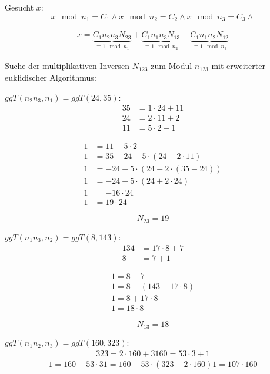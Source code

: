 Gesucht $x$:
$$ x \mod n_{1} = C_{1} \wedge
   x \mod n_{2} = C_{2} \wedge
   x \mod n_{3} = C_{3} \wedge   $$

\begin{align}
	x = \underbrace{C_{1} n_{2} n_{3} N_{23}}_{\equiv 1 \mod n_1}
	  + \underbrace{C_{1} n_{1} n_{3} N_{13}}_{\equiv 1 \mod n_2}
	  + \underbrace{C_{1} n_{1} n_{2} N_{12}}_{\equiv 1 \mod n_3}
\end{align}

Suche der multiplikativen Inversen $N_{123}$ zum Modul $n_{123}$ mit erweiterter euklidischer Algorithmus:

$ggT(n_{2}n_{3},n_{1}) = ggT(24,35):$
\begin{align}
35 &= 1 \cdot 24+11			\\
24 &= 2 \cdot 11+2			\\
11 &= 5 \cdot 2+1			
\end{align}

\begin{align}
1 &= 11 - 5 \cdot 2						\\
1 &= 35 -24 - 5 \cdot (24-2 \cdot 11)	\\
1 &= -24 -5 \cdot (24-2 \cdot (35-24))  \\
1 &= -24 -5 \cdot (24+2 \cdot 24)		\\
1 &= -16 \cdot 24						\\
1 &=  19 \cdot 24						
\end{align}

$$N_{23} = 19$$

$ggT(n_{1}n_{3}, n_{2}) = ggT(8,143):$
\begin{align}
134   &= 17 \cdot 8+7			\\
8     &= 7+1
\end{align}

\begin{align}
1 = 8 -7						\\
1 = 8 -(143-17 \cdot 8)			\\
1 = 8+17 \cdot 8				\\
1 = 18 \cdot 8					
\end{align}

$$N_{13} = 18$$

$ggT(n_{1}n_{2}, n_{3}) = ggT(160,323):$
\begin{align}
323 = 2 \cdot 160+3
160 = 53 \cdot 3+1
\end{align}
\begin{align}
1 = 160-53 \cdot 3
1 = 160-53 \cdot (323-2 \cdot 160)
1 = 107 \cdot 160
\end{align}

